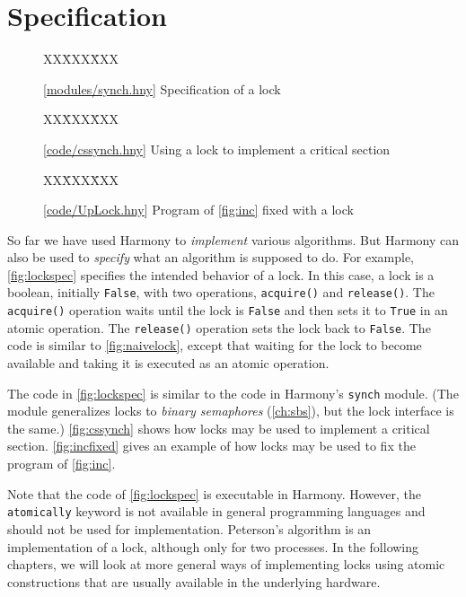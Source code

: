 \documentclass{report}
\newcommand{\harmonysource}[1]{
\begin{tabbing}
XX\=XXX\=XXX\kill
    
\end{tabbing}
}
\newcommand{\harmonylink}[1]{%
[\href{https://harmony.cs.cornell.edu/#1}{\underline{#1}}]%
}
\newenvironment{code}{
\tcolorbox
}{
\endtcolorbox
}
\begin{document}
\chapter{Specification}
\label{ch:specification}

\begin{figure}
\begin{code}
\harmonysource{lockspec}
\end{code}
\caption{\harmonylink{modules/synch.hny} Specification of a lock}
\label{fig:lockspec}
\end{figure}

\begin{figure}
\begin{code}
\harmonysource{cssynch}
\end{code}
\caption{\harmonylink{code/cssynch.hny} Using a lock to implement a
critical section}
\label{fig:cssynch}
\end{figure}

\begin{figure}
\begin{code}
\harmonysource{UpLock}
\end{code}
\caption{\harmonylink{code/UpLock.hny} Program of \autoref{fig:inc} fixed with a lock}
\label{fig:incfixed}
\end{figure}

So far we have used Harmony to \emph{implement} various algorithms.
But Harmony can also be used to \emph{specify} what an algorithm is
supposed to do.
For example, \autoref{fig:lockspec} specifies the intended behavior
of a lock.
In this case, a lock is a boolean, initially \texttt{False},
with two operations, \texttt{acquire()} and \texttt{release()}.
The \texttt{acquire()} operation waits until the lock is \texttt{False}
and then sets it to \texttt{True} in an atomic operation.
The \texttt{release()} operation sets the lock back to \texttt{False}.
The code is similar to \autoref{fig:naivelock}, except that waiting
for the lock to become available and taking it is executed as an
atomic operation.

The code in \autoref{fig:lockspec} is similar to the code in
Harmony's \texttt{synch} module.
(The module generalizes locks to \emph{binary semaphores}
(\autoref{ch:sbs}), but the lock interface is the same.)
\autoref{fig:cssynch} shows how locks may be used to implement
a critical section.
\autoref{fig:incfixed} gives an example of how locks may be used
to fix the program of \autoref{fig:inc}.

Note that the code of \autoref{fig:lockspec} is executable in Harmony.
However, the \texttt{atomically} keyword is not available in general
programming languages and should not be used for implementation.
Peterson's algorithm is an implementation of a lock, although only for
two processes.  In the following chapters, we will look at more general
ways of implementing locks using atomic constructions that are usually
available in the underlying hardware.
\end{document}
